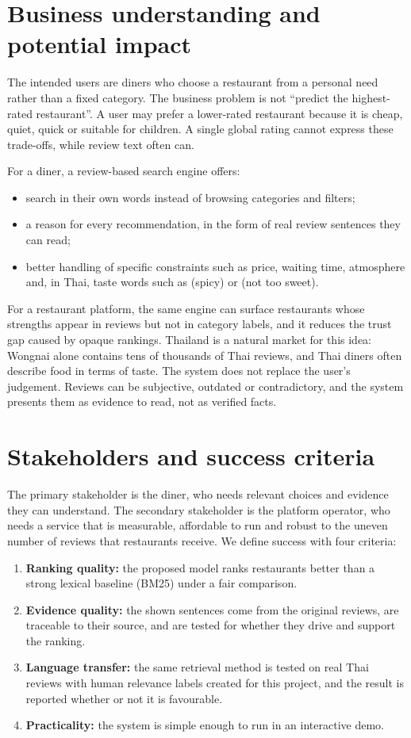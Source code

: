 \section{Business understanding and potential impact}
The intended users are diners who choose a restaurant from a personal need rather than a fixed
category. The business problem is not ``predict the highest-rated restaurant''. A user may
prefer a lower-rated restaurant because it is cheap, quiet, quick or suitable for children. A
single global rating cannot express these trade-offs, while review text often can.

For a diner, a review-based search engine offers:
\begin{itemize}
  \item search in their own words instead of browsing categories and filters;
  \item a reason for every recommendation, in the form of real review sentences they can read;
  \item better handling of specific constraints such as price, waiting time, atmosphere and,
  in Thai, taste words such as  (spicy) or  (not too sweet).
\end{itemize}

For a restaurant platform, the same engine can surface restaurants whose strengths appear in
reviews but not in category labels, and it reduces the trust gap caused by opaque rankings.
Thailand is a natural market for this idea: Wongnai alone contains tens of thousands of Thai
reviews, and Thai diners often describe food in terms of taste. The system does not replace
the user's judgement. Reviews can be subjective, outdated or contradictory, and the system
presents them as evidence to read, not as verified facts.

\section{Stakeholders and success criteria}
The primary stakeholder is the diner, who needs relevant choices and evidence they can
understand. The secondary stakeholder is the platform operator, who needs a service that is
measurable, affordable to run and robust to the uneven number of reviews that restaurants
receive. We define success with four criteria:
\begin{enumerate}
  \item \textbf{Ranking quality:} the proposed model ranks restaurants better than a strong
  lexical baseline (BM25) under a fair comparison.
  \item \textbf{Evidence quality:} the shown sentences come from the original reviews, are
  traceable to their source, and are tested for whether they drive and support the ranking.
  \item \textbf{Language transfer:} the same retrieval method is tested on real Thai reviews
  with human relevance labels created for this project, and the result is reported whether or
  not it is favourable.
  \item \textbf{Practicality:} the system is simple enough to run in an interactive demo.
\end{enumerate}

